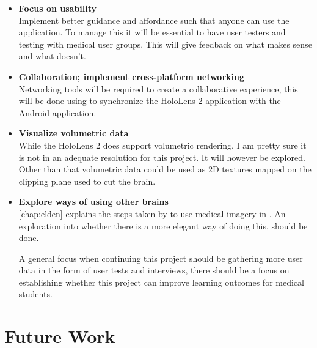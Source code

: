 \begin{itemize}

    \item {
        \textbf{Focus on usability}\\
        Implement better guidance and affordance such that anyone can use the application. To manage this it will be essential to have user testers and testing with medical user groups. This will give feedback on what makes sense and what doesn't.
        
    }
    \item {
        \textbf{Collaboration; implement cross-platform networking}\\
        Networking tools will be required to create a collaborative experience, this will be done using  to synchronize the HoloLens 2 application with the Android application.
    }

    \item {
        \textbf{Visualize volumetric data}\\
        While the HoloLens 2 does support volumetric rendering, I am pretty sure it is not in an adequate resolution for this project. It will however be explored. Other than that volumetric data could be used as 2D textures mapped on the clipping plane used to cut the brain.
    }

    \item {
        \textbf{Explore ways of using other brains}\\
        \autoref{chap:elden} explains the steps taken by \citet{Elden2017} to use medical imagery in . An exploration into whether there is a more elegant way of doing this, should be done.
    }

A general focus when continuing this project should be gathering more user data in the form of user tests and interviews, there should be a focus on establishing whether this project can improve learning outcomes for medical students.


\end{itemize}

\section{Future Work}





